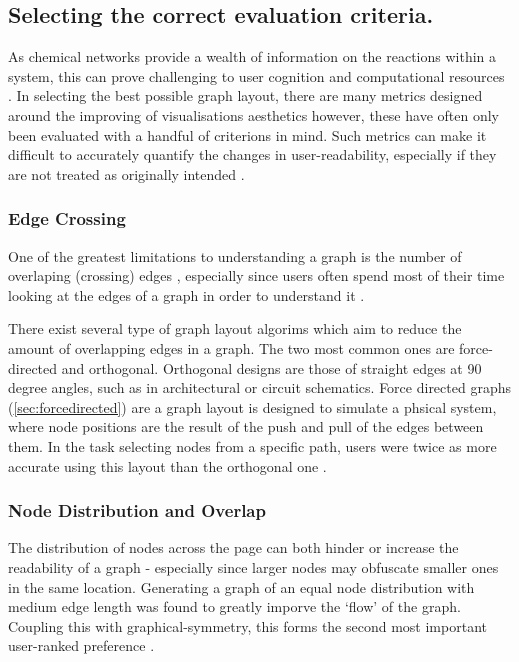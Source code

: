 \subsection{Selecting the correct evaluation criteria.}
As chemical networks provide a wealth of information on the reactions within a system, this can prove challenging to user cognition and computational resources \citep{ch1}. In selecting the best possible graph layout, there are many metrics designed around the improving of visualisations aesthetics \citep{metricgraphaesthetics} however, these have often only been evaluated with a handful of criterions in mind. Such metrics can make it difficult to accurately quantify the changes in user-readability, especially if they are not treated as originally intended \citep{eyetrack}. 


\subsubsection*{Edge Crossing} \label{sec:edgecross}
One of the greatest limitations to understanding a graph is the number of overlaping (crossing) edges \citep{humanaesthetic}, especially since users often spend most of their time looking at the edges of a graph in order to understand it \citep{eyetrack}. 

There exist several type of graph layout algorims which aim to reduce the amount of overlapping edges in a graph. The two most common ones are force-directed and orthogonal. Orthogonal designs are those of straight edges at 90 degree angles, such as in architectural or circuit schematics. Force directed graphs (\autoref{sec:forcedirected}) are a graph layout is designed to simulate a phsical system, where node positions are the result of the push and pull of the edges between them. In the task selecting nodes from a specific path, users were twice as more accurate using this layout than the orthogonal one \citep{eyetrack}.

    
 
\subsubsection*{Node Distribution and Overlap}\label{sec:ndist}

The distribution of nodes across the page can both hinder or increase the readability of a graph - especially since larger nodes may obfuscate smaller ones in the same location. Generating a graph of an equal node distribution with medium edge length was found to greatly imporve the `flow' of the graph. Coupling this with graphical-symmetry, this forms the second most important user-ranked preference \citep{ch6graphredability}. 

